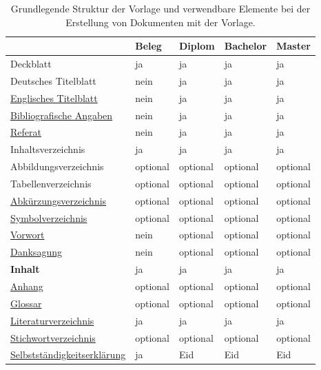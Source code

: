 	\begin{table}[!htb]
		\centering
		\caption{Grundlegende Struktur der Vorlage und verwendbare Elemente bei der Erstellung von Dokumenten mit der Vorlage.}
		\label{tab:documentStructure}
		\begin{tabular}{lllll}
			\toprule
			& \textbf{Beleg} & \textbf{Diplom} & \textbf{Bachelor} & \textbf{Master} \\
			\midrule
			Deckblatt & ja & ja & ja & ja \\
			Deutsches Titelblatt & nein & ja & ja & ja \\
			\hyperref[itm:englishTitle]{Englisches Titelblatt} & nein & ja & ja & ja \\
			\hyperref[itm:bibliographicData]{Bibliografische Angaben} & nein & ja & ja & ja \\
			\hyperref[itm:abstract]{Referat} & nein & ja & ja & ja \\
			\cmidrule(r){1-1}
			\cmidrule(l){2-5}
			Inhaltsverzeichnis & ja & ja & ja & ja \\
			Abbildungsverzeichnis & optional & optional & optional & optional \\
			Tabellenverzeichnis & optional & optional & optional & optional \\
			\hyperref[itm:acronyms]{Abkürzungsverzeichnis} & optional & optional & optional & optional \\
			\hyperref[itm:symbols]{Symbolverzeichnis} & optional & optional & optional & optional \\
			\cmidrule(r){1-1}
			\cmidrule(l){2-5}
			\hyperref[itm:preface]{Vorwort} & nein & optional & optional & optional \\
			\hyperref[itm:dedication]{Danksagung} & nein & optional & optional & optional \\
			\cmidrule(r){1-1}
			\cmidrule(l){2-5}
			\textbf{Inhalt} & ja & ja & ja & ja \\
			\hyperref[itm:appendix]{Anhang} & optional & optional & optional & optional \\
			\cmidrule(r){1-1}
			\cmidrule(l){2-5}
			\hyperref[itm:glossary]{Glossar} & optional & optional & optional & optional \\
			\hyperref[itm:bibliography]{Literaturverzeichnis} & ja & ja & ja & ja \\
			\hyperref[itm:index]{Stichwortverzeichnis} & optional & optional & optional & optional \\
			\hyperref[itm:soa]{Selbstständigkeitserklärung} & ja & Eid & Eid & Eid \\
			\bottomrule
		\end{tabular}
	\end{table}
	
